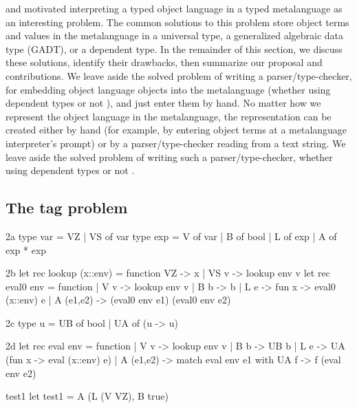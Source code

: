  and \citet{xi-guarded} motivated interpreting
a typed object language in a typed metalanguage as an interesting
problem.  The common solutions to this problem store object terms and
values in the metalanguage in a universal type, a generalized algebraic
data type (GADT), or a dependent type.  In the remainder of this section,
we discuss these solutions, identify their drawbacks, then summarize our
proposal and contributions.  
\ifshort
We leave aside the solved problem of writing a parser\slash type\hyp checker,
for embedding object language objects into the metalanguage
(whether using dependent types \citep{WalidICFP02} or not \citep{baars-typing}),
and just enter them by hand.
\else
No matter how we represent the object language in the
metalanguage, the representation can be created either by hand (for example, by
entering object terms at a metalanguage interpreter's prompt) or
by a parser\slash type\hyp checker reading from a text string.
We leave aside the solved problem of writing such a parser\slash type\hyp checker,
whether using dependent types \citep{WalidICFP02} or not \citep{baars-typing}.
\fi

\subsection{The tag problem}\label{tagproblem}

\begin{SaveVerbatim}{2a}
type var = VZ | VS of var
type exp = V of var | B of bool | L of exp | A of exp * exp
\end{SaveVerbatim}
\begin{SaveVerbatim}[commandchars=\@\{\}]{2b}
let rec lookup (x::env) = function VZ -> x | VS v -> lookup env v
let rec eval0 env = function
| V v       -> lookup env v
| B b       -> b 
| L e       -> fun x -> eval0 (x::env) e
| A (e1,e2) -> (eval0 env e1) (eval0 env e2) 
\end{SaveVerbatim}
\begin{SaveVerbatim}{2c}
type u = UB of bool | UA of (u -> u)
\end{SaveVerbatim}
\begin{SaveVerbatim}{2d}
let rec eval env = function
| V v       -> lookup env v
| B b       -> UB b
| L e       -> UA (fun x -> eval (x::env) e)
| A (e1,e2) -> match eval env e1 with UA f -> f (eval env e2)
\end{SaveVerbatim}
\begin{SaveVerbatim}{test1}
let test1 = A (L (V VZ), B true)
\end{SaveVerbatim}

